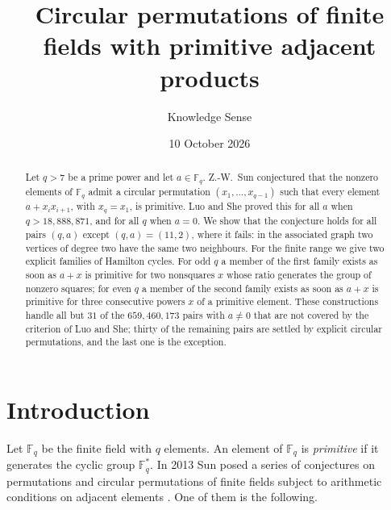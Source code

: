 \documentclass{amsart}
\theoremstyle{remark}
\numberwithin{equation}{section}
\numberwithin{table}{section}
\newcommand{\F}{\mathbb{F}}
\begin{document}
\title[Circular permutations with primitive adjacent products]{Circular permutations of finite fields with primitive adjacent products}

\author{Knowledge Sense}
\address{Knowledge Sense}

\date{10 October 2026}


\begin{abstract}
Let $q>7$ be a prime power and let $a\in\F_q$. Z.-W.~Sun conjectured that the nonzero elements of $\F_q$ admit a circular permutation $(x_1,\dots,x_{q-1})$ such that every element $a+x_ix_{i+1}$, with $x_q=x_1$, is primitive. Luo and She proved this for all $a$ when $q>18{,}888{,}871$, and for all $q$ when $a=0$. We show that the conjecture holds for all pairs $(q,a)$ except $(q,a)=(11,2)$, where it fails: in the associated graph two vertices of degree two have the same two neighbours. For the finite range we give two explicit families of Hamilton cycles. For odd $q$ a member of the first family exists as soon as $a+x$ is primitive for two nonsquares $x$ whose ratio generates the group of nonzero squares; for even $q$ a member of the second family exists as soon as $a+x$ is primitive for three consecutive powers $x$ of a primitive element. These constructions handle all but $31$ of the $659{,}460{,}173$ pairs with $a\neq0$ that are not covered by the criterion of Luo and She; thirty of the remaining pairs are settled by explicit circular permutations, and the last one is the exception.
\end{abstract}

\maketitle

\section{Introduction}

Let $\F_q$ be the finite field with $q$ elements. An element of $\F_q$ is \emph{primitive} if it generates the cyclic group $\F_q^{*}$. In 2013 Sun posed a series of conjectures on permutations and circular permutations of finite fields subject to arithmetic conditions on adjacent elements \cite{Sun}. One of them is the following.
\end{document}
